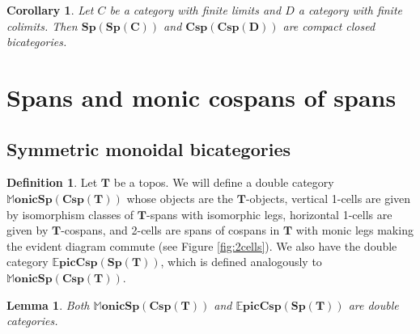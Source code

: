 \documentclass[11pt]{amsart}
\newcommand{\cat}[1]{\mathbf{#1}}
\newcommand{\bispsp}[1]{\mathbf{Sp(Sp(#1))}}
\newcommand{\bicspcsp}[1]{\mathbf{Csp(Csp(#1))}}
\newcommand{\dblmonspcsp}[1]{\mathbb{M}\mathbf{onicSp(Csp(#1))}}
\newcommand{\dblepiccspsp}[1]{\mathbb{E}\mathbf{picCsp(Sp(#1))}}
\newtheorem{lem}[thm]{Lemma}
\newtheorem{cor}[thm]{Corollary}
\theoremstyle{remark}
\theoremstyle{definition}
\newtheorem{defn}[thm]{Definition}
\begin{document}
\begin{cor}
	\label{cor:SpansSpansAreCCBicat}
	Let $C$ be a category with finite limits and $D$ a category with finite colimits. Then $\bispsp{C}$ and $\bicspcsp{D}$ are compact closed bicategories.
\end{cor}

\section{Spans and monic cospans of spans} %
\label{sec:SpansCospans}

\subsection{Symmetric monoidal bicategories} %
\label{subsec.SpansCospansAreSMBicat}

\begin{defn}
\label{def:DblCatMonSpanCsp}
	Let $\cat{T}$ be a topos. We will define a double category $\dblmonspcsp{T}$ whose objects are the $\cat{T}$-objects, vertical 1-cells are given by isomorphism classes of $\cat{T}$-spans with isomorphic legs, horizontal 1-cells are given by $\cat{T}$-cospans, and 2-cells are spans of cospans in $\cat{T}$ with monic legs making the evident diagram commute (see Figure \ref{fig:2cells}). We also have the double category $\dblepiccspsp{T}$, which is defined analogously to $\dblmonspcsp{T}$. 
\end{defn}

\begin{lem}
\label{lem:SpanCospanDoubleCat}
	Both $\dblmonspcsp{T}$ and $\dblepiccspsp{T}$ are double categories.  
\end{lem}
\end{document}
